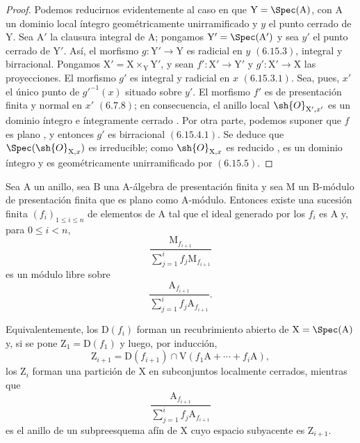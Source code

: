 \begin{proof}
Podemos reducirnos evidentemente al caso en que $\mathrm{Y}=\Spec(\mathrm{A})$, con $\mathrm{A}$ un dominio local íntegro geométricamente unirramificado y $y$ el punto cerrado de $\mathrm{Y}$. Sea $\mathrm{A}'$ la clausura integral de $\mathrm{A}$; pongamos $\mathrm{Y}'=\Spec(\mathrm{A}')$ y sea $y'$ el punto cerrado de $\mathrm{Y}'$. Así, el morfismo $g:\mathrm{Y}'\to\mathrm{Y}$ es radicial en $y$ $(6.15.3)$, integral y birracional. Pongamos $\mathrm{X}'=\mathrm{X}\times_\mathrm{Y}\mathrm{Y}'$, y sean $f':\mathrm{X}'\to\mathrm{Y}'$ y $g':\mathrm{X}'\to\mathrm{X}$ las proyecciones. El morfismo $g'$ es integral y radicial en $x$ $(6.15.3.1)$. Sea, pues, $x'$ el único punto de $g'^{-1}(x)$ situado sobre $y'$. El morfismo $f'$ es de presentación finita y normal en $x'$ $(6.7.8)$; en consecuencia, el anillo local $\sh{O}_{\mathrm{X}',x'}$ es un dominio íntegro e íntegramente cerrado . Por otra parte, podemos suponer que $f$ es plano , y entonces $g'$ es birracional $(6.15.4.1)$. Se deduce que $\Spec(\sh{O}_{\mathrm{X},x})$ es irreducible; como $\sh{O}_{\mathrm{X},x}$ es reducido , es un dominio íntegro y es geométricamente unirramificado por $(6.15.5)$.
\end{proof}

\begin{proposition}[11.3.15]
\label{IV.11.3.15}
Sea $\mathrm{A}$ un anillo, sea $\mathrm{B}$ una $\mathrm{A}$-álgebra de presentación finita y sea $\mathrm{M}$ un $\mathrm{B}$-módulo de presentación finita que es plano como $\mathrm{A}$-módulo. Entonces existe una sucesión finita $(f_i)_{1\leqslant i\leqslant n}$ de elementos de $\mathrm{A}$ tal que el ideal generado por los $f_i$ es $\mathrm{A}$ y, para $0\leqslant i<n$,
\[
  \frac{\mathrm{M}_{f_{i+1}}}
       {\sum_{j=1}^{i}f_j\mathrm{M}_{f_{i+1}}}
\]
es un módulo libre sobre
\[
  \frac{\mathrm{A}_{f_{i+1}}}
       {\sum_{j=1}^{i}f_j\mathrm{A}_{f_{i+1}}}.
\]
\end{proposition}

Equivalentemente, los $\mathrm{D}(f_i)$ forman un recubrimiento abierto de $\mathrm{X}=\Spec(\mathrm{A})$ y, si se pone $\mathrm{Z}_1=\mathrm{D}(f_1)$ y luego, por inducción,
\[
  \mathrm{Z}_{i+1}
  =\mathrm{D}(f_{i+1})
   \cap\mathrm{V}(f_1\mathrm{A}+\cdots+f_i\mathrm{A}),
\]
los $\mathrm{Z}_i$ forman una partición de $\mathrm{X}$ en subconjuntos localmente cerrados, mientras que
\[
  \frac{\mathrm{A}_{f_{i+1}}}
       {\sum_{j=1}^{i}f_j\mathrm{A}_{f_{i+1}}}
\]
es el anillo de un subpreesquema afín de $\mathrm{X}$ cuyo espacio subyacente es $\mathrm{Z}_{i+1}$.

